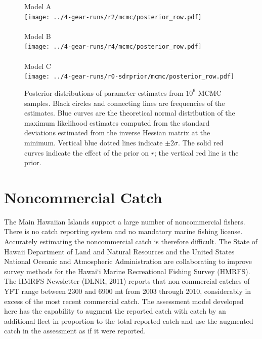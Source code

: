 \documentclass[12pt,letterpaper]{article}
\begin{document}
\begin{figure}
\begin{center}
{\sffamily
Model A\\
\texttt{[image: ../4-gear-runs/r2/mcmc/posterior\_row.pdf]}\\
~\\
Model B\\
\texttt{[image: ../4-gear-runs/r4/mcmc/posterior\_row.pdf]}\\
~\\
Model C\\
\texttt{[image: ../4-gear-runs/r0-sdrprior/mcmc/posterior\_row.pdf]}\\
}
\end{center}
\caption{Posterior distributions of parameter estimates from $10^6$
MCMC samples. 
Black circles and connecting lines are frequencies of the estimates.
Blue curves are the theoretical normal distribution of the maximum
likelihood estimates computed from the standard deviations estimated
from the inverse Hessian matrix at the minimum. 
Vertical blue dotted lines indicate $\pm 2\sigma$.
The solid red curves indicate the effect of the prior on $r$; the
vertical red line is the prior.
\label{fig:posteriors}}
\end{figure}



\clearpage
\section{Noncommercial Catch}
\label{sec:klingon}
The Main Hawaiian Islands support a large number of noncommercial
fishers. There is no catch reporting system and no mandatory marine fishing
license. 
Accurately estimating the noncommercial catch is therefore difficult. 
The State of Hawaii Department of Land and Natural Resources and the
United States National Oceanic and Atmospheric Administration are  
collaborating to improve survey methods for the Hawai`i Marine
Recreational Fishing Survey (HMRFS). The HMRFS Newsletter (DLNR, 2011)
reports that non-commercial catches of YFT range between 2300 and 6900
mt from 2003 through 2010, considerably in excess of the most recent
commercial catch. The assessment model developed here has the capability to
augment the reported catch with catch by an additional fleet in
proportion to the total reported catch and use the augmented catch in
the assessment as if it were reported.
\end{document}
